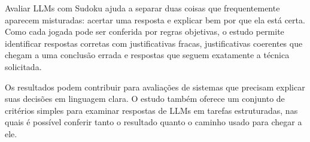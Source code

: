 Avaliar LLMs com Sudoku ajuda a separar duas coisas que frequentemente aparecem misturadas: acertar uma resposta e explicar bem por que ela está certa. Como cada jogada pode ser conferida por regras objetivas, o estudo permite identificar respostas corretas com justificativas fracas, justificativas coerentes que chegam a uma conclusão errada e respostas que seguem exatamente a técnica solicitada.

Os resultados podem contribuir para avaliações de sistemas que precisam explicar suas decisões em linguagem clara. O estudo também oferece um conjunto de critérios simples para examinar respostas de LLMs em tarefas estruturadas, nas quais é possível conferir tanto o resultado quanto o caminho usado para chegar a ele.
